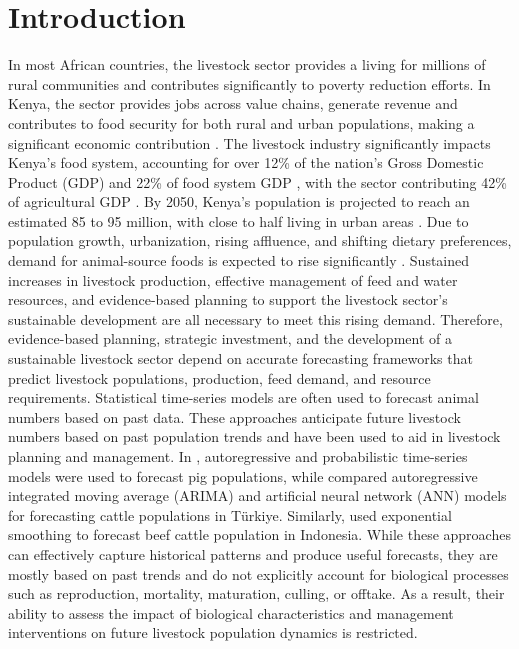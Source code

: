 \section{Introduction}

In most African countries, the livestock sector provides a living for millions of rural communities and contributes significantly to poverty reduction efforts. In Kenya, the sector provides jobs across value chains, generate revenue and contributes to food security for both rural and urban populations, making a significant economic contribution \cite{behnke2011}. The livestock industry significantly impacts Kenya's food system, accounting for over 12\% of the nation's Gross Domestic Product (GDP) and 22\% of food system GDP \cite{bahta2023livestock}, with the sector contributing 42\% of agricultural GDP \cite{nyariki2019}.
By 2050, Kenya's population is projected to reach an estimated 85 to 95 million, with close to half living in urban areas \cite{knbs2019}. Due to population growth, urbanization, rising affluence, and shifting dietary preferences, demand for animal-source foods is expected to rise significantly \cite{bahta2023livestock}. Sustained increases in livestock production, effective management of feed and water resources, and evidence-based planning to support the livestock sector's sustainable development are all necessary to meet this rising demand. Therefore, evidence-based planning, strategic investment, and the development of a sustainable livestock sector depend on accurate forecasting frameworks that predict livestock populations, production, feed demand, and resource requirements.
Statistical time-series models are often used to forecast animal numbers based on past data. These approaches anticipate future livestock numbers based on past population trends and have been used to aid in livestock planning and management. In \cite{mykyta2025forecasting}, autoregressive and probabilistic time-series models were used to forecast pig populations, while \cite{ozbek2025forecasting} compared autoregressive integrated moving average (ARIMA) and artificial neural network (ANN) models for forecasting cattle populations in Türkiye. Similarly, \cite{rahmi2026forecasting} used exponential smoothing to forecast beef cattle population in Indonesia. While these approaches can effectively capture historical patterns and produce useful forecasts, they are mostly based on past trends and do not explicitly account for biological processes such as reproduction, mortality, maturation, culling, or offtake. As a result, their ability to assess the impact of biological characteristics and management interventions on future livestock population dynamics is restricted.

